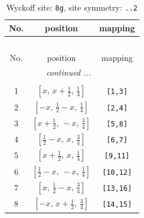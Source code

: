 \documentclass[fleqn,8pt]{jsarticle}
\begin{document}
\renewcommand{\arraystretch}{1.2}
\begin{longtable}{ccc}
\caption{Wyckoff site: {\tt 8g}, site symmetry: {\tt ..2}}
 \\
 \hline \hline
No. & position & mapping \\ \hline \endfirsthead

\multicolumn{2}{l}{\tablename\ \thetable{}} \\
 \hline \hline
No. & position & mapping \\ \hline \endhead

 \hline \hline
\multicolumn{2}{r}{\footnotesize\it continued ...} \\ \endfoot

 \hline \hline
\multicolumn{2}{r}{} \\ \endlastfoot

1 & $\left[ x,\, x + \frac{1}{2},\, \frac{1}{4} \right]$ & {\tt [1,3]} \\ \hline
2 & $\left[ - x,\, \frac{1}{2} - x,\, \frac{1}{4} \right]$ & {\tt [2,4]} \\ \hline
3 & $\left[ x + \frac{1}{2},\, - x,\, \frac{3}{4} \right]$ & {\tt [5,8]} \\ \hline
4 & $\left[ \frac{1}{2} - x,\, x,\, \frac{3}{4} \right]$ & {\tt [6,7]} \\ \hline
5 & $\left[ x + \frac{1}{2},\, x,\, \frac{1}{4} \right]$ & {\tt [9,11]} \\ \hline
6 & $\left[ \frac{1}{2} - x,\, - x,\, \frac{1}{4} \right]$ & {\tt [10,12]} \\ \hline
7 & $\left[ x,\, \frac{1}{2} - x,\, \frac{3}{4} \right]$ & {\tt [13,16]} \\ \hline
8 & $\left[ - x,\, x + \frac{1}{2},\, \frac{3}{4} \right]$ & {\tt [14,15]} \\
\end{longtable}
\renewcommand{\arraystretch}{1.2}
\end{document}
